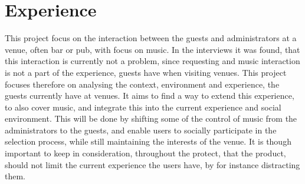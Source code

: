 \section{Experience}
This project focus on the interaction between the guests and administrators at a venue, often bar or pub, with focus on music.
In the interviews it was found, that this interaction is currently not a problem, since requesting and music interaction is not a part of the experience, guests have when visiting venues. This project focuses therefore on analysing the context, environment and experience, the guests currently have at venues. It aims to find a way to extend this experience, to also cover music, and integrate this into the current experience and social environment. This will be done by shifting some of the control of music from the administrators to the guests, and enable users to socially participate in the selection process, while still maintaining the interests of the venue. It is though important to keep in consideration, throughout the protect, that the product, should not limit the current experience the users have, by for instance distracting them.